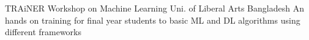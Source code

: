 \cventry
    {TRAiNER}
    {Workshop on Machine Learning }
    {Uni. of Liberal Arts Bangladesh}
    {}
    {
      An hands on training for final year students to basic ML and DL algorithms using different frameworks
    }